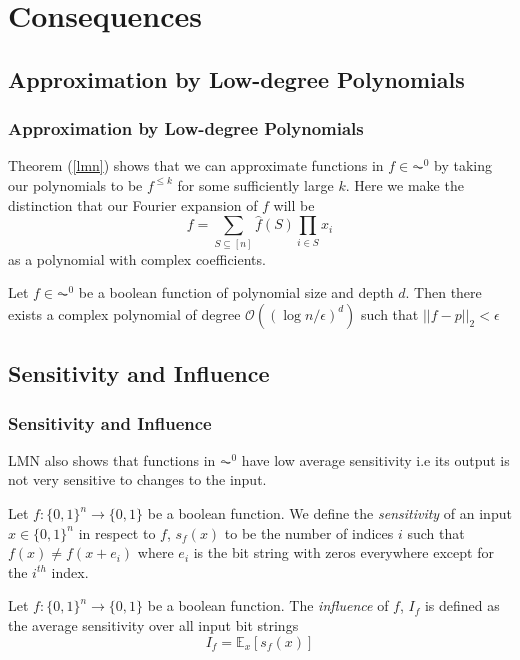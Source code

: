 \documentclass{beamer}
\begin{document}
\section{Consequences}
\subsection{Approximation by Low-degree Polynomials}

\begin{frame}
  \frametitle{Approximation by Low-degree Polynomials}
   Theorem (\ref{lmn}) shows that we can approximate functions in $f \in \AC^0$ by taking our polynomials to be $f^{\leq k}$ for some sufficiently large $k$. Here we make the distinction that our Fourier expansion of $f$ will be
  $$f = \sum_{S \subseteq [n]} \hat{f}(S) \prod_{i \in S} x_i $$ as a polynomial with complex coefficients.
  \begin{lemma}
    Let $f \in \AC^0$ be a boolean function of polynomial size and depth $d$. Then there exists a complex polynomial of degree $\mathcal{O}((\log{n/\epsilon})^d)$ such that $||f - p ||_2 < \epsilon$
  \end{lemma}
\end{frame}

\subsection{Sensitivity and Influence}

\begin{frame}
  \frametitle{Sensitivity and Influence}
  LMN also shows that functions in $\AC^0$ have low average sensitivity i.e its output is not very sensitive to changes to the input.
  \begin{definition}
    Let $f: \{0,1\}^n \rightarrow \{0,1\}$ be a boolean function. We define the \emph{sensitivity} of an input $x\in \{0,1\}^n$ in respect to $f$, $s_f(x)$ to be the number of indices $i$ such that $f(x) \neq f(x + e_i)$ where $e_i$ is the bit string with zeros everywhere except for the $i^{th}$ index.
  \end{definition}

  \begin{definition}
    Let $f: \{0,1\}^n \rightarrow \{0,1\}$ be a boolean function. The \emph{influence} of $f$, $I_f$ is defined as the average sensitivity over all input bit strings
    \begin{equation}
      I_f = \mathbb{E}_x[s_f(x)]
    \end{equation}
  \end{definition}
\end{frame}
\end{document}

